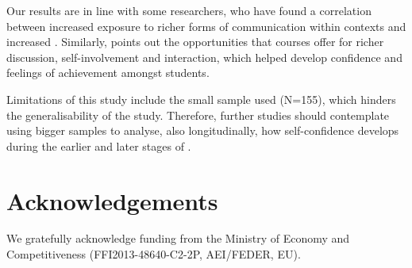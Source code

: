 \documentclass[output=paper]{langsci/langscibook}
\begin{document}
Our results are in line with some researchers, who have found a correlation between increased exposure to richer forms of communication within  contexts and increased   \citep{Wong2010}. Similarly, \cite{Coyle2013} points out the opportunities that  courses offer for richer discussion, self-involvement and interaction, which helped develop confidence and feelings of achievement amongst students. 



Limitations of this study include the small sample used (N=155), which hinders the generalisability of the study.  Therefore, further studies should contemplate using bigger samples to analyse, also longitudinally, how  self-confidence develops during the earlier and later stages of .  


\section*{Acknowledgements}
We gratefully acknowledge funding from the  Ministry of Economy and Competitiveness (FFI2013-48640-C2-2P, AEI/FEDER, EU). 

 
\sloppy
\printbibliography[heading=subbibliography,notkeyword=this] 
\end{document}
